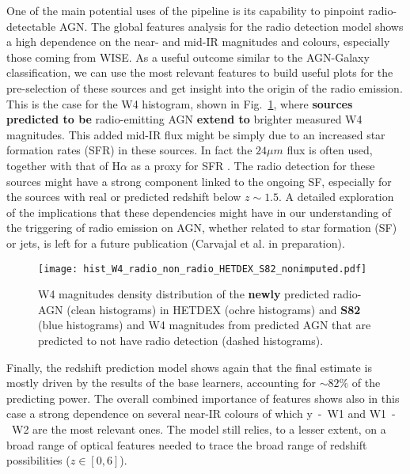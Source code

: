 \documentclass{aa}
\begin{document}
One of the main potential uses of the pipeline is its capability to pinpoint radio-detectable AGN. The global features analysis for the radio detection model shows a high dependence on the near- and mid-IR magnitudes and colours, especially those coming from WISE. As a useful outcome similar to the AGN-Galaxy classification, we can use the most relevant features to build useful plots for the pre-selection of these sources and get insight into the origin of the radio emission. This is the case for the W4 histogram, shown in Fig.~\ref{fig:hist_W4_nonimputed_pred_radio_non_radio_AGN}, where \textbf{sources predicted to be} radio-emitting AGN \textbf{extend to} brighter measured W4 magnitudes. This added mid-IR flux might be simply due to an increased star formation rates (SFR) in these sources. In fact the $24\mu m$ flux is often used, together with that of H$\alpha$ as a proxy for SFR \citep{2009ApJ...703.1672K}. The radio detection for these sources might have a strong component linked to the ongoing SF, especially for the sources with real or predicted redshift below ${z {\sim} 1.5}$. A detailed exploration of the implications that these dependencies might have in our understanding of the triggering of radio emission on AGN, whether related to star formation (SF) or jets, is left for a future publication (Carvajal et al. in preparation).

\begin{figure}
  \centering
    \texttt{[image: hist\_W4\_radio\_non\_radio\_HETDEX\_S82\_nonimputed.pdf]}
  \caption{W4 magnitudes density distribution of the \textbf{newly} predicted radio-AGN  (clean histograms) in HETDEX (ochre histograms) and \textbf{S82} (blue histograms) and W4 magnitudes from predicted AGN that are predicted to not have radio detection (dashed histograms).}
  \label{fig:hist_W4_nonimputed_pred_radio_non_radio_AGN}
\end{figure}

Finally, the redshift prediction model shows again that the final estimate is mostly driven by the results of the base learners, accounting for ${\sim} 82\%$ of the predicting power. The overall combined importance of features shows also in this case a strong dependence on several near-IR colours of which y~-~W1 and W1~-~W2 are the most relevant ones. 
The model still relies, to a lesser extent, on a broad range of optical features needed to trace the broad range of redshift possibilities ($z \in [0,6]$).%
\end{document}
